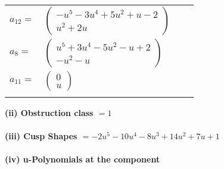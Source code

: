 \documentclass[1p]{elsarticle_modified}
\theoremstyle{definition}
\begin{document}
\begin{tabular}{m{7pt} m{180pt} m{7pt} m{180pt} }
\flushright $a_{12}=$&$\begin{pmatrix}- u^5-3 u^4+5 u^2+u-2\\u^2+2 u\end{pmatrix}$ \\
\flushright $a_{8}=$&$\begin{pmatrix}u^5+3 u^4-5 u^2- u+2\\- u^2- u\end{pmatrix}$ \\
\flushright $a_{11}=$&$\begin{pmatrix}0\\u\end{pmatrix}$\\&\end{tabular}
\flushleft \textbf{(ii) Obstruction class $= 1$}\\~\\
\flushleft \textbf{(iii) Cusp Shapes $= -2 u^5-10 u^4-8 u^3+14 u^2+7 u+1$}\\~\\
\newpage\renewcommand{\arraystretch}{1}
\flushleft \textbf{(iv) u-Polynomials at the component}\newline \\
\end{document}
